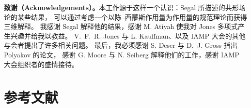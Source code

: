 \documentclass[11pt,a4paper]{article}
\begin{document}
%
%

\textbf{致谢（Acknowledgements）。}本工作源于这样一个认识：Segal 所描述的共形场论的某些结果，
可以通过考虑一个以陈–西蒙斯作用量为作用量的规范理论而获得三维解释。
我感谢 Segal 解释他的结果，感谢 M. Atiyah 使我对 Jones 多项式产生兴趣并给我以教益。
V.~F.~R. Jones 与 L. Kauffman、以及 IAMP 大会的其他与会者提出了许多相关问题。
最后，我必须感谢 S. Deser 与 D.~J. Gross 指出 Polyakov 的论文，
感谢 G. Moore 与 N. Seiberg 解释他们的工作，感谢 IAMP 大会组织者的盛情接待。


\section*{参考文献}
\end{document}

